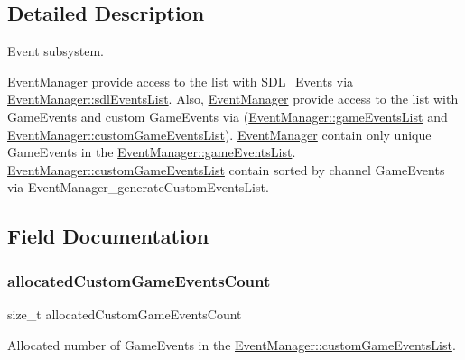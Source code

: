 \subsection{Detailed Description}
Event subsystem. 

\hyperlink{struct_event_manager}{Event\+Manager} provide access to the list with S\+D\+L\+\_\+\+Events via \hyperlink{struct_event_manager_ac563054d2cefbd8d20b1daf70eb35d78}{Event\+Manager\+::sdl\+Events\+List}. Also, \hyperlink{struct_event_manager}{Event\+Manager} provide access to the list with Game\+Events and custom Game\+Events via (\hyperlink{struct_event_manager_aa2b0ad79c0a87b310b5adf8feaf9ffd4}{Event\+Manager\+::game\+Events\+List} and \hyperlink{struct_event_manager_a72dc8ad68e1875aed6c94372ff3a51ce}{Event\+Manager\+::custom\+Game\+Events\+List}). \hyperlink{struct_event_manager}{Event\+Manager} contain only unique Game\+Events in the \hyperlink{struct_event_manager_aa2b0ad79c0a87b310b5adf8feaf9ffd4}{Event\+Manager\+::game\+Events\+List}. \hyperlink{struct_event_manager_a72dc8ad68e1875aed6c94372ff3a51ce}{Event\+Manager\+::custom\+Game\+Events\+List} contain sorted by channel Game\+Events via Event\+Manager\+\_\+generate\+Custom\+Events\+List. 

\subsection{Field Documentation}
\hypertarget{struct_event_manager_a274ca9e47ebe07804dc743b3cd3db162}{}\label{struct_event_manager_a274ca9e47ebe07804dc743b3cd3db162} 
\subsubsection{\texorpdfstring{allocated\+Custom\+Game\+Events\+Count}{allocatedCustomGameEventsCount}}
{\footnotesize\ttfamily size\+\_\+t allocated\+Custom\+Game\+Events\+Count}

Allocated number of Game\+Events in the \hyperlink{struct_event_manager_a72dc8ad68e1875aed6c94372ff3a51ce}{Event\+Manager\+::custom\+Game\+Events\+List}. \hypertarget{struct_event_manager_a621a8cfb46dee22293a680cf51bc01e4}{}\label{struct_event_manager_a621a8cfb46dee22293a680cf51bc01e4} 
